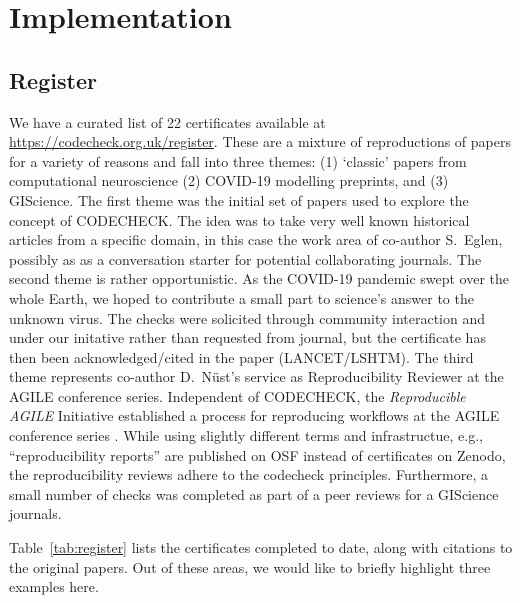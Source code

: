 \documentclass[12pt]{article}
\begin{document}
\section*{Implementation}\label{implementation}

\subsection*{Register}\label{register}

We have a curated list of 22 certificates available at
\url{https://codecheck.org.uk/register}. These are a mixture of
reproductions of papers for a variety of reasons and fall into three themes:
(1) `classic' papers from computational neuroscience
(2) COVID-19 modelling preprints, and
(3) GIScience.  
The first theme was the initial set of papers used to explore the concept
of CODECHECK. The idea was to take very well known historical articles from a 
specific domain, in this case the work area of co-author S.~Eglen, possibly 
as as a conversation starter for potential collaborating journals.
The second theme is rather opportunistic. As the COVID-19 pandemic swept
over the whole Earth, we hoped to contribute a small part to science's answer
to the unknown virus. The checks were solicited through community interaction
and under our initative rather than requested from journal, but the certificate
has then been acknowledged/cited in the paper (LANCET/LSHTM). %
The third theme represents co-author D.~N\"ust's service as Reproducibility
Reviewer at the AGILE conference series.
Independent of CODECHECK, the \emph{Reproducible AGILE} Initiative \cite{reproducible_agile}
established a process for reproducing workflows at the AGILE conference
series \cite{nust_improving_2020}.
While using slightly different terms and infrastructue, e.g., ``reproducibility
reports'' are published on OSF instead of certificates on Zenodo, the 
reproducibility reviews adhere to the codecheck principles.
Furthermore, a small number of checks was completed as part of a peer reviews
for a GIScience journals.

Table~\ref{tab:register} lists the certificates completed to date,
along with citations to the original papers.
Out of these areas, we would like to briefly highlight three examples here.
\end{document}
